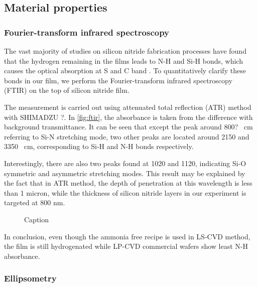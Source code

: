 \subsection{Material properties}

\subsubsection{Fourier-transform infrared spectroscopy}
The vast majority of studies on silicon nitride fabrication processes have found that the hydrogen remaining in the films leads to N-H and Si-H bonds, which causes the optical absorption at S and C band \cites{Ay2004, Agnihotri2000}. To quantitatively clarify these bonds in our film, we perform the Fourier-transform infrared spectroscopy (FTIR) on the top of silicon nitride film.

The measurement is carried out using attenuated total reflection (ATR) method with SHIMADZU ?. In \autoref{fig:ftir}, the absorbance is taken from the difference with background transmittance. It can be seen that except the peak around 800? \si{\per\cm} referring to Si-N stretching mode, two other peaks are located around 2150 and 3350 \si{\per\cm}, corresponding to Si-H and N-H bonds respectively.

Interestingly, there are also two peaks found at 1020 and 1120, indicating Si-O symmetric and asymmetric stretching modes. This result may be explained by the fact that in ATR method, the depth of penetration at this wavelength is less than 1 micron, while the thickness of silicon nitride layers in our experiment is targeted at 800 nm.


\begin{figure}
    \centering
    
    \caption{Caption}
    \label{fig:ftir}
\end{figure}

In conclusion, even though the ammonia free recipe is used in LS-CVD method, the film is still hydrogenated while LP-CVD commercial wafers show least N-H absorbance.

\subsubsection{Ellipsometry}

\begin{figure}
	\centering
	
	\label{fig:ellipso}
\end{figure}

